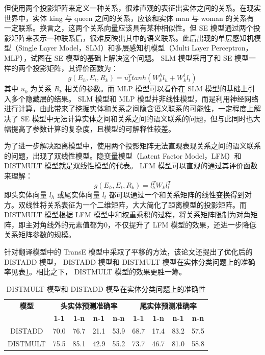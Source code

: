 \documentclass{llncs}
\begin{document}
但使用两个投影矩阵来定义一种关系，很难直观的表征出实体之间的关系。在现实世界中，实体 king 与 queen 之间的关系，应该和实体 man 与 woman 的关系有一定联系。换言之，这两个关系向量应该具有某种相似性。但 SE 模型通过两个投影矩阵来表示一种联系后，很难反映出其中的语义联系。此后出现的单层感知机模型（Single Layer Model，SLM）\cite{DBLP:conf/nips/SocherCMN13}和多层感知机模型（Multi Layer Perceptron，MLP）\cite{DBLP:conf/kdd/0001GHHLMSSZ14}，试图在 SE 模型的基础上解决这个问题。 SLM 模型采用了和 SE 模型一样的两个投影矩阵，其评价函数为：
\begin{displaymath}
g(E_h,E_t,R_k)=u_k^Ttanh(W^h_kl_h+W^t_kl_t)
\end{displaymath}
其中 $u_k$ 为关系 $R_k$ 相关的参数。而 MLP 模型可以看作在 SLM 模型的基础上引入多个隐藏层的结果。 SLM 模型和 MLP 模型并非线性模型，而是利用神经网络进行计算，由此带来了挖掘实体和关系之间隐含语义联系的可能性，一定程度上解决了 SE 模型中无法计算实体之间和关系之间的语义联系的问题，但与此同时也大幅提高了参数计算的复杂度，且模型的可解释性较差。

为了进一步解决距离模型中，使用两个投影矩阵无法直观表现关系之间的语义联系的问题，出现了双线性模型。隐变量模型（Latent Factor Model，LFM）\cite{DBLP:conf/nips/JenattonRBO12,NIPS2009_3863}和 DISTMULT 模型\cite{DBLP:journals/corr/YangYHGD14a}就是双线性模型的代表。 LFM 模型可以直观的通过其评价函数来理解：
\begin{displaymath}
g(E_h,E_t,R_k)=l_h^TW_kl_t^T
\end{displaymath}
即头实体向量 $l_h$ 或尾实体向量 $l_t$ 都可以通过一个和关系矩阵的线性变换得到对方。双线性将关系表征为一个二维矩阵，大大简化了距离模型的投影矩阵。而 DISTMULT 模型根据 LFM 模型中和权重乘积的过程，将关系矩阵限制为对角矩阵，即主对角线外的元素值都为0，不仅提升了 LFM 模型的效果，还进一步降低关系矩阵参数的规模。

针对翻译模型中的 TransE 模型\cite{DBLP:conf/nips/BordesUGWY13}中采取了平移的方法，该论文还提出了优化后的 DISTADD 模型\cite{DBLP:journals/corr/YangYHGD14a}， DISTADD 模型和 DISTMULT 模型在实体分类问题上的准确率见表\ref{tb:DISTMULT&DISTADD}。相比之下， DISTMULT 模型的效果更胜一筹。

\begin{table}
	\centering
	\caption{ DISTMULT 模型和 DISTADD 模型在实体分类问题上的准确性}
	\label{tb:DISTMULT&DISTADD}
	\begin{threeparttable}
		\begin{tabular}{ccccccccc}
			\hline
			\textbf{模型} & \multicolumn{4}{c}{\textbf{头实体预测准确率}} & \multicolumn{4}{c}{\textbf{尾实体预测准确率}} \\
			\textbf{} & \textbf{1-1} & \textbf{1-n} & \textbf{n-1} & \textbf{n-n} & \textbf{1-1} & \textbf{1-n} & \textbf{n-1} & \textbf{n-n} \\ \hline
			DISTADD & 70.0 & 76.7 & 21.1 & 53.9 & 68.7 & 17.4 & 83.2 & 57.5 \\
			DISTMULT & 75.5 & 85.1 & 42.9 & 55.2 & 73.7 & 46.7 & 81.0 & 58.8 \\ \hline
		\end{tabular}
	\end{threeparttable}
\end{table}
\end{document}
